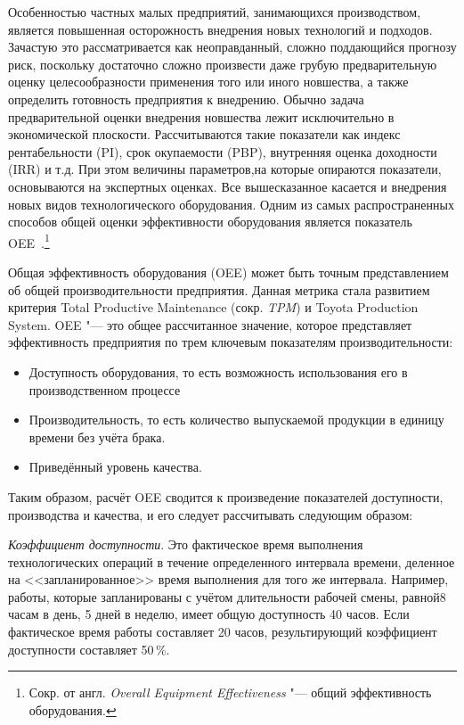 Особенностью частных малых предприятий, занимающихся производством, является повышенная осторожность внедрения новых технологий и подходов. Зачастую это рассматривается как неоправданный, сложно поддающийся прогнозу риск, поскольку достаточно сложно произвести даже грубую предварительную оценку целесообразности применения того или иного новшества, а также определить готовность предприятия к внедрению. Обычно задача предварительной оценки внедрения новшества лежит исключительно в экономической плоскости. Рассчитываются такие показатели как индекс рентабельности (PI), срок окупаемости (PBP), внутренняя оценка доходности (IRR) и т.\:д. При этом величины параметров,на которые опираются показатели,  основываются на экспертных оценках. Все вышесказанное касается и внедрения новых видов технологического оборудования. Одним из самых распространенных способов общей оценки эффективности оборудования является показатель OEE~\cite{oee}.\footnote{Сокр. от англ. \textit{Overall Equipment Effectiveness} "--- общий эффективность оборудования.}

Общая эффективность оборудования (OEE) может быть точным представлением об общей производительности предприятия. Данная метрика стала развитием критерия Total Productive Maintenance (сокр. \textit{TPM}) и  Toyota Production System. OEE "--- это общее рассчитанное значение, которое представляет эффективность предприятия по трем ключевым показателям производительности:

\begin{itemize}
	\item Доступность оборудования, то есть возможность использования его в производственном процессе
	\item Производительность, то есть количество выпускаемой продукции в единицу времени без учёта брака.
	\item Приведённый уровень качества. 
\end{itemize}


Таким образом, расчёт OEE сводится к произведение показателей доступности, производства и качества, и его следует рассчитывать следующим образом:

\textit{Коэффициент доступности}. Это фактическое время выполнения технологических операций в течение определенного интервала времени, деленное на <<запланированное>> время выполнения для того же интервала. Например, работы, которые запланированы с учётом длительности рабочей смены, равной8 часам в день, 5 дней в неделю, имеет общую доступность 40 часов. Если фактическое время работы составляет 20 часов, результирующий коэффициент доступности составляет 50\,\%.


